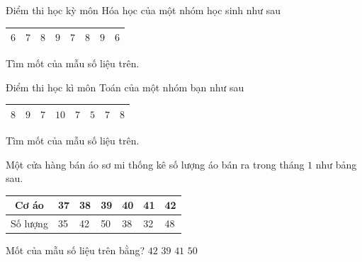 \begin{bt}%
	Điểm thi học kỳ môn Hóa học của một nhóm học sinh như sau
	\begin{center}
		\begin{tabular}{|c|c|c|c|c|c|c|c|}
			\hline
			$6$ & $7$ & $8$ & $9$ & $7$ & $8$ & $9$ & $6$ \\ \hline
		\end{tabular}
	\end{center}
	Tìm mốt của mẫu số liệu trên.
	
\end{bt}

\begin{bt}%
	Điểm thi học kì môn Toán của một nhóm bạn như sau
	\begin{center}
		\begin{tabular}{|c|c|c|c|c|c|c|c|}
			\hline
			$8$ & $9$ & $7$ & $10$ & $7$ & $5$ & $7$ & $8$ \\ \hline
		\end{tabular}
	\end{center}
	Tìm mốt của mẫu số liệu trên.
	
\end{bt}

\begin{ex}%
	Một cửa hàng bán áo sơ mi thống kê  số lượng áo bán ra trong tháng $ 1 $ như bảng sau.
	\begin{center}
		\begin{tabular}{|c|l|l|l|l|l|l|}
			\hline Cơ áo & 37 & 38 & 39 & 40 & 41 &  42 \\
			\hline Số lượng & 35 & 42 & 50  & 38 & 32 & 48 \\
			\hline 
		\end{tabular}
	\end{center}
	Mốt của mẫu số liệu trên  bằng?
	\choice 
		 {$ 42 $}
		{$ 39 $} 
		 {$ 41 $}
		{\True $  50 $}
\end{ex}
